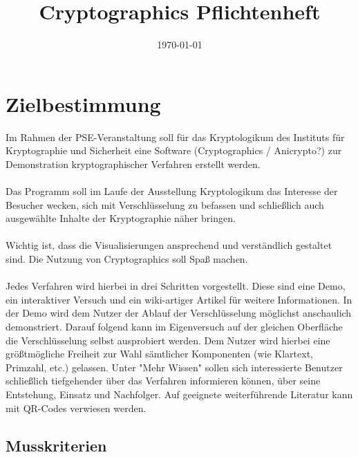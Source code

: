 \documentclass{article}
\title{Cryptographics Pflichtenheft}
\author{}
\date{\today}
\begin{document}
\maketitle
\tableofcontents
\newpage

\section{Zielbestimmung}


Im Rahmen der PSE-Veranstaltung soll für das Kryptologikum des Instituts für 
Kryptographie und Sicherheit eine Software (Cryptographics / Anicrypto?) zur 
Demonstration kryptographischer Verfahren erstellt werden. \\
\\
Das Programm soll im Laufe der Ausstellung Kryptologikum das Interesse der Besucher wecken, sich mit Verschlüsselung zu befassen und schließlich auch ausgewählte Inhalte der Kryptographie näher bringen. \\
\\
Wichtig ist, dass die Visualisierungen ansprechend und verständlich gestaltet sind. Die Nutzung von Cryptographics soll Spaß machen. \\
\\
Jedes Verfahren wird hierbei in drei Schritten vorgestellt. Diese sind eine Demo, ein interaktiver Versuch und ein wiki-artiger Artikel für weitere Informationen.
In der Demo wird dem Nutzer der Ablauf der Verschlüsselung möglichst anschaulich demonstriert. Darauf folgend kann im Eigenversuch auf der gleichen Oberfläche die Verschlüsselung selbst ausprobiert werden. Dem Nutzer wird hierbei eine größtmögliche Freiheit zur Wahl sämtlicher Komponenten (wie Klartext, Primzahl, etc.) gelassen. Unter "Mehr Wissen" sollen sich interessierte Benutzer schließlich tiefgehender über das Verfahren informieren können, über seine Entstehung, Einsatz und Nachfolger. Auf geeignete weiterführende Literatur kann mit QR-Codes verwiesen werden. \\


\subsection{Musskriterien}
\end{document}
